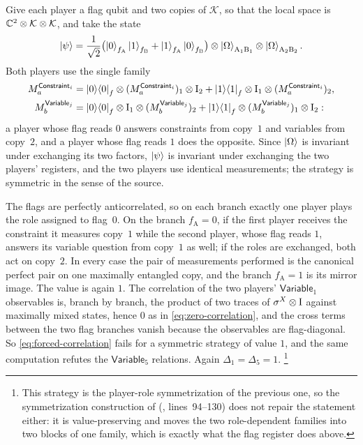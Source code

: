 \documentclass[11pt]{article}
\newcommand{\Id}{\mathrm{I}}
\newcommand{\Constraint}{\mathsf{Constraint}}
\newcommand{\Variable}{\mathsf{Variable}}
\begin{document}
Give each player a flag qubit and two copies of $\mathcal K$, so that the local
space is $\mathbb{C}^2 \otimes \mathcal K \otimes \mathcal K$, and take the state
\[
  \ket{\psi} = \frac{1}{\sqrt2}
    \bigl( \ket{0}_{f_{\mathrm A}}\ket{1}_{f_{\mathrm B}}
         + \ket{1}_{f_{\mathrm A}}\ket{0}_{f_{\mathrm B}} \bigr)
    \otimes \ket{\Omega}_{\mathrm A_1 \mathrm B_1}
    \otimes \ket{\Omega}_{\mathrm A_2 \mathrm B_2} .
\]
Both players use the single family
\begin{align*}
  M^{\Constraint_i}_a
    &= \ket{0}\!\bra{0}_f \ot (M^{\Constraint_i}_a)_1 \ot \Id_2
     + \ket{1}\!\bra{1}_f \ot \Id_1 \ot (M^{\Constraint_i}_a)_2 , \\
  M^{\Variable_j}_b
    &= \ket{0}\!\bra{0}_f \ot \Id_1 \ot (M^{\Variable_j}_b)_2
     + \ket{1}\!\bra{1}_f \ot (M^{\Variable_j}_b)_1 \ot \Id_2 :
\end{align*}
a player whose flag reads $0$ answers constraints from copy~$1$ and variables
from copy~$2$, and a player whose flag reads $1$ does the opposite.  Since
$\ket{\Omega}$ is invariant under exchanging its two factors, $\ket{\psi}$ is
invariant under exchanging the two players' registers, and the two players use
identical measurements; the strategy is symmetric in the sense of the source.

The flags are perfectly anticorrelated, so on each branch exactly one player
plays the role assigned to flag~$0$.  On the branch $f_{\mathrm A} = 0$, if the
first player receives the constraint it measures copy~$1$ while the second
player, whose flag reads $1$, answers its variable question from copy~$1$ as
well; if the roles are exchanged, both act on copy~$2$.  In every case the pair
of measurements performed is the canonical perfect pair on one maximally
entangled copy, and the branch $f_{\mathrm A} = 1$ is its mirror image.  The
value is again $1$.  The correlation of the two players' $\Variable_1$
observables is, branch by branch, the product of two traces of $\sigma^X \ot
\Id$ against maximally mixed states, hence $0$ as in
\eqref{eq:zero-correlation}, and the cross terms between the two flag branches
vanish because the observables are flag-diagonal.  So
\eqref{eq:forced-correlation} fails for a symmetric strategy of value $1$,
and the same computation refutes the $\Variable_5$ relations.  Again
$\Delta_1 = \Delta_5 = 1$.%
\footnote{This strategy is the player-role symmetrization of the previous one,
so the symmetrization construction of 
(, lines~94--130)
does not repair the statement either: it is value-preserving and moves the two
role-dependent families into two blocks of one family, which is exactly what
the flag register does above.}
\end{document}
